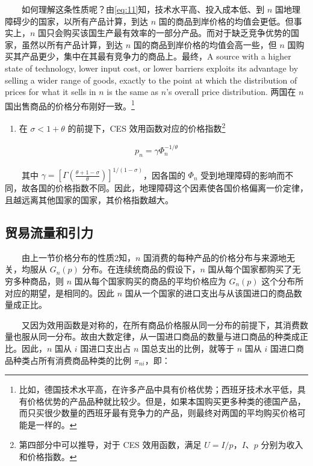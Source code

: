 \documentclass[]{article}
\providecommand{\tightlist}{%
  \setlength{\itemsep}{0pt}\setlength{\parskip}{0pt}}
\let\rmarkdownfootnote\footnote%
\def\footnote{\protect\rmarkdownfootnote}
\begin{document}
　　如何理解这条性质呢？由\eqref{eq:11}知，技术水平高、投入成本低、到 \(n\) 国地理障碍少的国家，以所有产品计算，到达 \(n\) 国的商品到岸价格的均值会更低。但事实上，\(n\) 国只会购买该国生产最有效率的一部分产品。而对于缺乏竞争优势的国家，虽然以所有产品计算，到达 \(n\) 国的商品到岸价格的均值会高一些，但 \(n\) 国购买其产品更少，集中在其最有竞争力的商品上。最终，A source with a higher state of technology, lower input cost, or lower barriers exploits its advantage by selling a wider range of goods, exactly to the point at which the distribution of prices for what it sells in \(n\) is the same as \(n\)'s overall price distribution. 两国在 \(n\) 国出售商品的价格分布刚好一致。\footnote{比如，德国技术水平高，在许多产品中具有价格优势；西班牙技术水平低，具有价格优势的产品品种就比较少。但是，如果本国购买更多种类的德国产品，而只买很少数量的西班牙最有竞争力的产品，则最终对两国的平均购买价格可能是一样的。}

\begin{enumerate}
\def\labelenumi{\arabic{enumi}.}
\setcounter{enumi}{2}
\tightlist
\item
  在 \(\sigma < 1 + \theta\) 的前提下，CES 效用函数对应的价格指数\footnote{第四部分中可以推导，对于 CES 效用函数，满足 \(U=I/p\)，\(I、p\) 分别为收入和价格指数。}
\end{enumerate}

\begin{align}
p_{n}=\gamma \Phi_{n}^{-1 / \theta}  \label{eq:9}
\end{align}

　　其中 \(\gamma=\left[\Gamma\left(\frac{\theta+1-\sigma}{\theta}\right)\right]^{1 /(1-\sigma)}\)，因各国的 \(\Phi_{n}\) 受到地理障碍的影响而不同，故各国的价格指数不同。因此，地理障碍这个因素使各国价格偏离一价定律，且越远离其他国家的国家，其价格指数越大。

\hypertarget{section-10}{%
\subsection{贸易流量和引力}\label{section-10}}

　　由上一节价格分布的性质2知，\(n\) 国消费的每种产品的价格分布与来源地无关，均服从 \(G_n(p)\) 分布。在连续统商品的假设下，\(n\) 国从每个国家都购买了无穷多种商品，则 \(n\) 国从每个国家购买的商品的平均价格应为 \(G_n(p)\) 这个分布所对应的期望，是相同的。因此 \(n\) 国从一个国家的进口支出与从该国进口的商品数量成正比。

　　又因为效用函数是对称的，在所有商品价格服从同一分布的前提下，其消费数量也服从同一分布。故由大数定律，从一国进口商品的数量与进口商品的种类成正比。因此，\(n\) 国从 \(i\) 国进口支出占 \(n\) 国总支出的比例，就等于 \(n\) 国从 \(i\) 国进口商品种类占所有消费商品种类的比例 \(\pi_{ni}\)，即：
\end{document}
